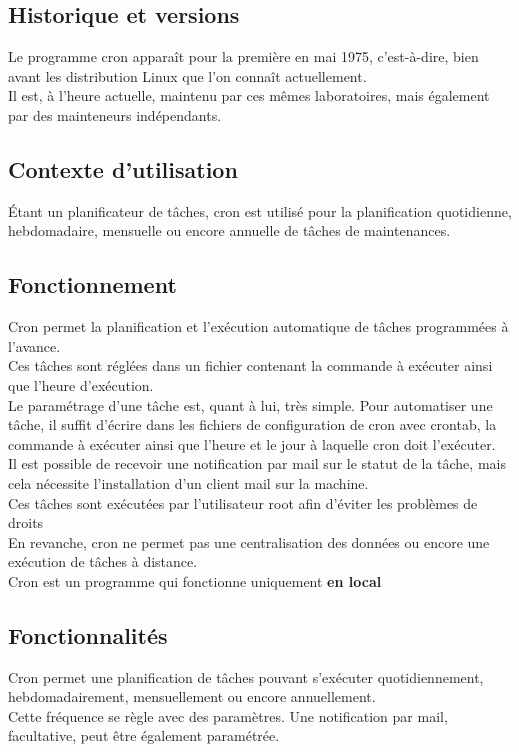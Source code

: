 \documentclass[12pt]{article}
\begin{document}
\subsection{Historique et versions}
Le programme cron apparaît pour la première en mai 1975, c'est-à-dire, bien avant les distribution Linux que l'on connaît actuellement.
\\
Il est, à l'heure actuelle, maintenu par ces mêmes laboratoires, mais également par des mainteneurs indépendants.

\subsection{Contexte d'utilisation}
Étant un planificateur de tâches, cron est utilisé pour la planification quotidienne, hebdomadaire, mensuelle ou encore annuelle de tâches de maintenances.

\subsection{Fonctionnement}
Cron permet la planification et l'exécution automatique de tâches programmées à l'avance.
\\
Ces tâches sont réglées dans un fichier contenant la commande à exécuter ainsi que l'heure d'exécution.
\\
Le paramétrage d'une tâche est, quant à lui, très simple. Pour automatiser une tâche, il suffit d'écrire dans les fichiers de configuration de cron avec crontab, la commande à exécuter ainsi que l'heure et le jour à laquelle cron doit l'exécuter.
\\
Il est possible de recevoir une notification par mail sur le statut de la tâche, mais cela nécessite l'installation d'un client mail sur la machine.
\\
Ces tâches sont exécutées par l'utilisateur root afin d'éviter les problèmes de droits
\\
En revanche, cron ne permet pas une centralisation des données ou encore une exécution de tâches à distance.
\\
Cron est un programme qui fonctionne uniquement \textbf{en local}

\subsection{Fonctionnalités}
Cron permet une planification de tâches pouvant s'exécuter quotidiennement, hebdomadairement, mensuellement ou encore annuellement. 
\\
Cette fréquence se règle avec des paramètres. Une notification par mail, facultative, peut être également paramétrée.
\end{document}
